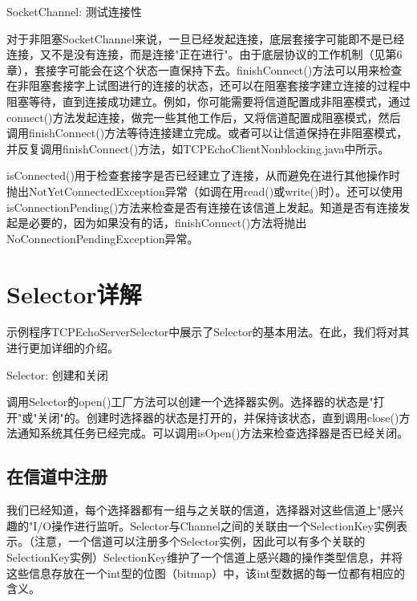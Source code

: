 	SocketChannel: 测试连接性 

	

	对于非阻塞SocketChannel来说，一旦已经发起连接，底层套接字可能即不是已经连接，又不是没有连接，而是连接"正在进行"。由于底层协议的工作机制（见第6章），套接字可能会在这个状态一直保持下去。finishConnect()方法可以用来检查在非阻塞套接字上试图进行的连接的状态，还可以在阻塞套接字建立连接的过程中阻塞等待，直到连接成功建立。例如，你可能需要将信道配置成非阻塞模式，通过connect()方法发起连接，做完一些其他工作后，又将信道配置成阻塞模式，然后调用finishConnect()方法等待连接建立完成。或者可以让信道保持在非阻塞模式，并反复调用finishConnect()方法，如TCPEchoClientNonblocking.java中所示。 

	isConnected()用于检查套接字是否已经建立了连接，从而避免在进行其他操作时抛出NotYetConnectedException异常（如调在用read()或write()时）。还可以使用isConnectionPending()方法来检查是否有连接在该信道上发起。知道是否有连接发起是必要的，因为如果没有的话，finishConnect()方法将抛出NoConnectionPendingException异常。 

\section{Selector详解} 

	示例程序TCPEchoServerSelector中展示了Selector的基本用法。在此，我们将对其进行更加详细的介绍。 

	Selector: 创建和关闭 

	

	调用Selector的open()工厂方法可以创建一个选择器实例。选择器的状态是"打开"或"关闭"的。创建时选择器的状态是打开的，并保持该状态，直到调用close()方法通知系统其任务已经完成。可以调用isOpen()方法来检查选择器是否已经关闭。 

	\subsection{在信道中注册}

		我们已经知道，每个选择器都有一组与之关联的信道，选择器对这些信道上"感兴趣的"I/O操作进行监听。Selector与Channel之间的关联由一个SelectionKey实例表示。（注意，一个信道可以注册多个Selector实例，因此可以有多个关联的SelectionKey实例）SelectionKey维护了一个信道上感兴趣的操作类型信息，并将这些信息存放在一个int型的位图（bitmap）中，该int型数据的每一位都有相应的含义。 

